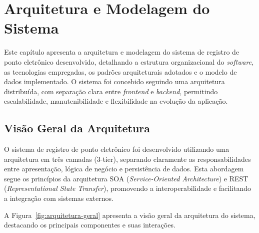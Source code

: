 \chapter{Arquitetura e Modelagem do Sistema}

Este capítulo apresenta a arquitetura e modelagem do sistema de registro de ponto eletrônico desenvolvido, detalhando a estrutura organizacional do \textit{software}, as tecnologias empregadas, os padrões arquiteturais adotados e o modelo de dados implementado. O sistema foi concebido seguindo uma arquitetura distribuída, com separação clara entre \textit{frontend} e \textit{backend}, permitindo escalabilidade, manutenibilidade e flexibilidade na evolução da aplicação.

\section{Visão Geral da Arquitetura}

O sistema de registro de ponto eletrônico foi desenvolvido utilizando uma arquitetura em três camadas (3-tier), separando claramente as responsabilidades entre apresentação, lógica de negócio e persistência de dados. Esta abordagem segue os princípios da arquitetura SOA (\textit{Service-Oriented Architecture}) e REST (\textit{Representational State Transfer}), promovendo a interoperabilidade e facilitando a integração com sistemas externos.

A Figura~\ref{fig:arquitetura-geral} apresenta a visão geral da arquitetura do sistema, destacando os principais componentes e suas interações.

